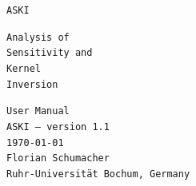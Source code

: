 \begin{titlepage}
\thispagestyle{empty}

  \begin{center}
    \tt \Huge ASKI
  \end{center}
  \vspace*{2cm}

  \begin{minipage}{0.5\textwidth}
    \begin{flushleft}
      \fontsize{20}{40} \selectfont
      {\tt {\Huge A}{\large nalysis of} \\ {\Huge S}{\large ensitivity and } \\ {\Huge\tt K}{\large ernel} \\ {\Huge\tt I}{\large nversion} }
    \end{flushleft}
  \end{minipage}
  \hfill
  \begin{minipage}{0.5\textwidth}
    \begin{flushright}
      {\fontsize{20}{40} \selectfont \tt {\Huge User Manual} \\  ASKI {\rm --} {\large version 1.1} \\ {\large \mydate \today} \\}
      {\tt {\large Florian Schumacher} \\ {\small Ruhr-Universit\"at Bochum, Germany} }
    \end{flushright}
  \end{minipage}

\vspace*{3cm}

\begin{center}
  \setlength{\fboxsep}{0pt}%
  \setlength{\fboxrule}{2pt}%
\end{center}

\end{titlepage}

